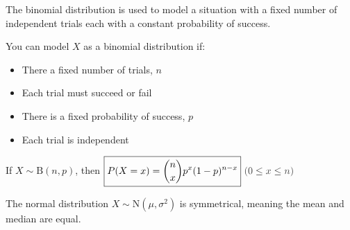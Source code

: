 \documentclass[../main.tex]{subfile}
\begin{document}


The binomial distribution is used to model a situation with a fixed number of independent trials each with a constant probability of success.

You can model $X$ as a binomial distribution if:
\begin{itemize}
	\item There a fixed number of trials, $n$
	\item Each trial must succeed or fail
	\item There is a fixed probability of success, $p$
	\item Each trial is independent
\end{itemize}

\begin{center}
	If $X \sim \text{B}(n, p)$, then $\boxed{P(X = x) = \binom{n}{x} p^x (1 - p)^{n - x}}\ \constraint{0 \leq x \leq n}$
\end{center}


The normal distribution $X \sim \text{N}(\mu, \sigma^2)$ is symmetrical, meaning the mean and median are equal.

\begin{figure}[h]
\begin{center}
\end{center}
\end{figure}
\end{document}
